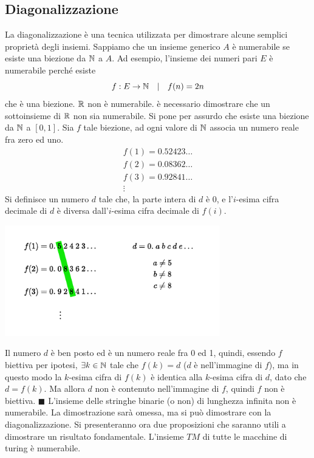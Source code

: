 \documentclass[10pt, letterpaper]{report}
\begin{document}
\subsection{Diagonalizzazione}
La diagonalizzazione è una tecnica utilizzata per dimostrare alcune semplici proprietà degli insiemi. Sappiamo che un insieme generico $A$ è numerabile se esiste una biezione da ${\mathbb N}$ a $A$. Ad esempio, l'insieme dei numeri pari $E$ è numerabile perché esiste $$ f:E\rightarrow {\mathbb N}\ \ \ | \ \ \  f(n)=2n$$ che è una biezione.\acc 
\teo{} ${\mathbb R}$ non è numerabile.\acc 
\dimo{} è necessario dimostrare che un sottoinsieme di ${\mathbb R}$ non sia numerabile. Si pone per assurdo che esiste una biezione da ${\mathbb N}$ a $[0,1]$. Sia $f$ tale biezione, ad ogni valore di ${\mathbb N}$ associa un numero reale fra zero ed uno.$$ \begin{matrix}
    f(1)=0.52423\dots\\ 
    f(2)=0.08362\dots\\ 
    f(3)=0.92841\dots\\ \vdots
\end{matrix}$$
Si definisce un numero $d$ tale che, la parte intera di $d$ è 0, e l'$i$-esima cifra decimale di $d$ è diversa dall'$i$-esima cifra decimale di $f(i)$.\begin{center}
    \includegraphics[width=0.7\textwidth ]{images/realiNonNumerabili..pdf}
\end{center}
Il numero $d$ è ben posto ed è un numero reale fra 0 ed 1, quindi, 
essendo $f$ biettiva per ipotesi, $\exists k \in {\mathbb N} $ tale che $ f(k)=d$ ($d$ è nell'immagine di $f$), ma in questo modo la $k$-esima cifra di $f(k)$ è identica alla $k$-esima cifra di $d$, dato che $d=f(k)$. Ma allora $d$ non è contenuto nell'immagine di $f$, quindi $f$ non è biettiva. \hfill$\blacksquare$\acc 
\prop{} L'insieme delle stringhe binarie (o non) di lunghezza infinita non è numerabile.\acc 
La dimostrazione sarà omessa, ma si può dimostrare con la diagonalizzazione. Si presenteranno ora due proposizioni che saranno utili a dimostrare un risultato fondamentale.\acc 
{} L'insieme $TM$ di tutte le macchine di turing è numerabile.\acc 
\end{document}
